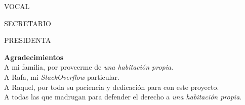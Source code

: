 \documentclass{article}
\begin{document}
    \begin{center}
     \large VOCAL  \\ [2.2 cm]
    \end{center}
    
    \begin{minipage}{0.5\textwidth}
     \begin{flushleft}
     \large SECRETARIO
    \end{flushleft}
    \end{minipage}
    \begin{minipage}{0.5\textwidth}
    \begin{flushright}
     \large PRESIDENTA 
    \end{flushright} 
    \end{minipage}
    \thispagestyle{empty}
    \pagebreak
    
    \clearpage\thispagestyle{empty}\null\newpage
    
    \noindent
    {\Large \textbf{Agradecimientos}} \\
    
    \noindent
    A mi familia, por proveerme de \textit{una habitación propia}. \\
    A Rafa, mi \textit{StackOverflow} particular. \\
    A Raquel, por toda su paciencia y dedicación para con este proyecto. \\
    A todas las que madrugan para defender el derecho a \textit{una habitación propia}.
    \thispagestyle{empty}
    
    \clearpage\thispagestyle{empty}\null\newpage
    
\end{document}
